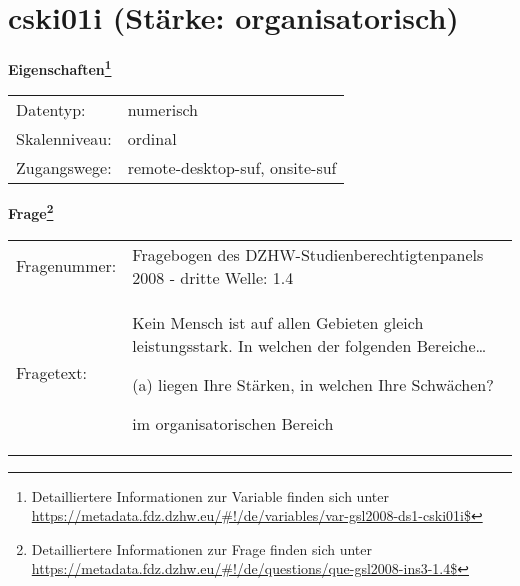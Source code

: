 
    \setcounter{footnote}{0}

    \vspace*{-1.8cm}
	\section{cski01i (Stärke: organisatorisch)}
	\label{section:cski01i}



    \vspace*{0.5cm}
    \noindent\textbf{Eigenschaften\footnote{Detailliertere Informationen zur Variable finden sich unter
		\url{https://metadata.fdz.dzhw.eu/\#!/de/variables/var-gsl2008-ds1-cski01i$}}}\\
	\begin{tabularx}{\hsize}{@{}lX}
	Datentyp: & numerisch \\
	Skalenniveau: & ordinal \\
	Zugangswege: &
	  remote-desktop-suf, 
	  onsite-suf
 \\
    \end{tabularx}



				\vspace*{0.5cm}
                \noindent\textbf{Frage\footnote{Detailliertere Informationen zur Frage finden sich unter
		              \url{https://metadata.fdz.dzhw.eu/\#!/de/questions/que-gsl2008-ins3-1.4$}}}\\
				\begin{tabularx}{\hsize}{@{}lX}
					Fragenummer: &
					  Fragebogen des DZHW-Studienberechtigtenpanels 2008 - dritte Welle:
					  1.4
 \\
					Fragetext: & Kein Mensch ist auf allen Gebieten gleich leistungsstark. In welchen der folgenden Bereiche…\par  (a) liegen Ihre Stärken, in welchen Ihre Schwächen?\par  im organisatorischen Bereich \\
				\end{tabularx}





